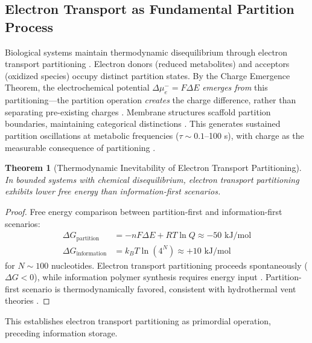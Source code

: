 \documentclass[11pt,a4paper]{article}
\newtheorem{theorem}{Theorem}[section]
\theoremstyle{remark}
\begin{document}
\subsection{Electron Transport as Fundamental Partition Process}

Biological systems maintain thermodynamic disequilibrium through electron transport partitioning \citep{nicholls2013bioenergetics, mitchell1961coupling, beinert1997iron}. Electron donors (reduced metabolites) and acceptors (oxidized species) occupy distinct partition states. By the Charge Emergence Theorem, the electrochemical potential $\Delta\mu_e^- = F\Delta E$ \emph{emerges from} this partitioning---the partition operation \emph{creates} the charge difference, rather than separating pre-existing charges \citep{mitchell1961coupling, Sachikonye2025_Partition}. Membrane structures scaffold partition boundaries, maintaining categorical distinctions \citep{nicholls2013bioenergetics}. This generates sustained partition oscillations at metabolic frequencies ($\tau \sim 0.1$--100 s), with charge as the measurable consequence of partitioning \citep{goldbeter1996biochemical, Sachikonye2025_Origins}.

\begin{theorem}[Thermodynamic Inevitability of Electron Transport Partitioning]
\label{thm:electron_partition}
In bounded systems with chemical disequilibrium, electron transport partitioning exhibits lower free energy than information-first scenarios.
\end{theorem}

\begin{proof}
Free energy comparison between partition-first and information-first scenarios:
\begin{align}
\Delta G_{\text{partition}} &= -nF\Delta E + RT\ln Q \approx -50 \text{ kJ/mol} \\
\Delta G_{\text{information}} &= k_BT \ln(4^N) \approx +10 \text{ kJ/mol}
\end{align}
for $N \sim 100$ nucleotides. Electron transport partitioning proceeds spontaneously ($\Delta G < 0$), while information polymer synthesis requires energy input \citep{orgel1968evolution, orgel2004prebiotic}. Partition-first scenario is thermodynamically favored, consistent with hydrothermal vent theories \citep{russell2007alkaline}.
\end{proof}

This establishes electron transport partitioning as primordial operation, preceding information storage.
\end{document}
